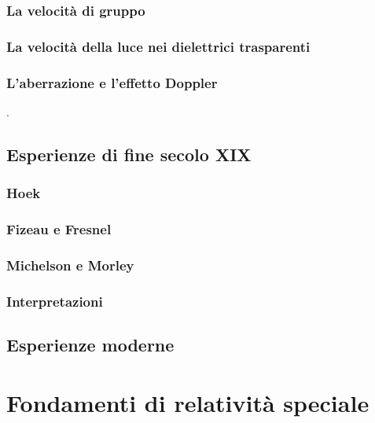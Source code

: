 \documentclass[a4paper,11pt]{book}
\theoremstyle{plain}
\theoremstyle{definition}
\begin{document}
\newpage

\subsection{La velocità di gruppo}

\newpage

\subsection{La velocità della luce nei dielettrici trasparenti}

\newpage

\subsection{L'aberrazione e l'effetto Doppler}

\newpage
.
\newpage

\section{Esperienze di fine secolo XIX}

\subsection{Hoek}

\newpage

\subsection{Fizeau e Fresnel}
\subsection{Michelson e Morley}

\newpage

\subsection{Interpretazioni}

\newpage

\section{Esperienze moderne}

\chapter{Fondamenti di relatività speciale}
\end{document}
